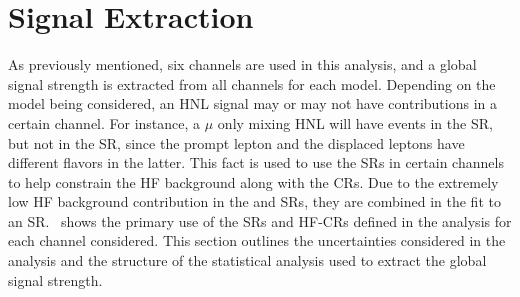 \section{Signal Extraction}\label{sec:sig_ext}
As previously mentioned, six channels are used in this analysis, and a global signal strength is extracted from all channels for each model. Depending on the model being considered, an HNL signal may or may not have contributions in a certain channel. For instance, a $\mu$ only mixing HNL will have events in the \uuu SR, but not in the \euu SR, since the prompt lepton and the displaced leptons have different flavors in the latter. This fact is used to use the SRs in certain channels to help constrain the HF background along with the CRs. Due to the extremely low HF background contribution in the \eee and \uee SRs, they are combined in the fit to an \xee SR.~ shows the primary use of the SRs and HF-CRs defined in the analysis for each channel considered. This section outlines the uncertainties considered in the analysis and the structure of the statistical analysis used to extract the global signal strength.

    \begin{table}[!htbp]
        \footnotesize
        \centering
     \caption{A summary of the use of the fit regions defined for the models that are used in the interpretation of the analysis results. {\color{green} Signal} represents when a region is mainly used for signal extraction, and {\color{red} Background} represents when a region is used for constraining the background from Heavy Flavor decays.}
     \label{tab:fit_structure}
\end{table}

